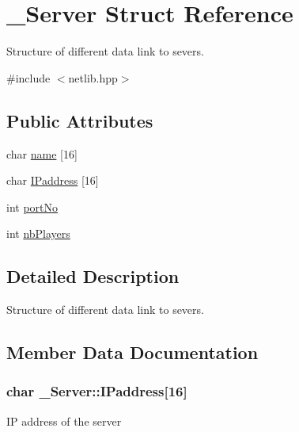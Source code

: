 \hypertarget{struct___server}{}\section{\+\_\+\+Server Struct Reference}
\label{struct___server}


Structure of different data link to severs.  




{\ttfamily \#include $<$netlib.\+hpp$>$}

\subsection*{Public Attributes}
\begin{DoxyCompactItemize}
\item 
char \hyperlink{struct___server_af7087c1549463291dc55f8d56311694e}{name} \mbox{[}16\mbox{]}
\item 
char \hyperlink{struct___server_a849e31353405bd7d83ad167451c2f986}{I\+Paddress} \mbox{[}16\mbox{]}
\item 
int \hyperlink{struct___server_aa3c9a499c4df79eb3222ee92cc9a1fc3}{port\+No}
\item 
int \hyperlink{struct___server_a928a5706037f53ff8e3a2a463b41f697}{nb\+Players}
\end{DoxyCompactItemize}


\subsection{Detailed Description}
Structure of different data link to severs. 

\subsection{Member Data Documentation}
\subsubsection[{\texorpdfstring{I\+Paddress}{IPaddress}}]{\setlength{\rightskip}{0pt plus 5cm}char \+\_\+\+Server\+::\+I\+Paddress\mbox{[}16\mbox{]}}\hypertarget{struct___server_a849e31353405bd7d83ad167451c2f986}{}\label{struct___server_a849e31353405bd7d83ad167451c2f986}
IP address of the server 
